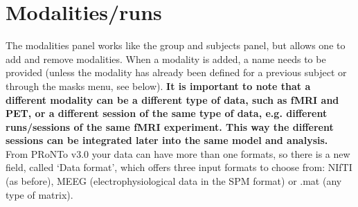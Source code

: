 



\section{Modalities/runs}

The modalities panel works like the group and subjects panel, but allows one to add and remove modalities. When a modality is added, a name needs to be provided (unless the modality has already been defined for a previous subject or through the masks menu, see below). \textbf{It is important to note that a different modality can be a different type of data, such as fMRI and PET, or a different session of the same type of data, e.g. different runs/sessions of the same fMRI experiment. This way the different sessions can be integrated later into the same model and analysis.}
\\

From PRoNTo v3.0 your data can have more than one formats, so there is a new field, called `Data format', which offers three input formats to choose from: NIfTI (as before), MEEG (electrophysiological data in the SPM format) or .mat (any type of matrix).
\\

